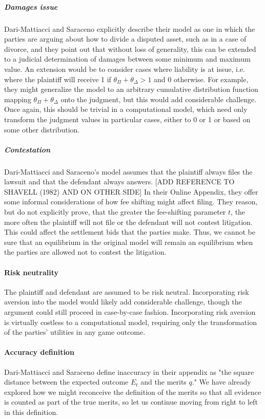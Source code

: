 \documentclass{article}
\begin{document}
\subparagraph{Damages issue}Dari-Mattiacci and Saraceno explicitly describe their model as one in which the parties are arguing about how to divide a disputed asset, such as in a case of divorce, and they point out that without loss of generality, this can be extended to a judicial determination of damages between some minimum and maximum value. An extension would be to consider cases where liability is at issue, i.e. where the plaintiff will receive 1 if $\theta_\Pi + \theta_\Delta > 1$ and 0 otherwise. For example, they might generalize the model to an arbitrary cumulative distribution function mapping $\theta_\Pi + \theta_\Delta$ onto the judgment, but this would add considerable challenge. Once again, this should be trivial in a computational model, which need only transform the judgment values in particular cases, either to 0 or 1 or based on some other distribution.   

\subparagraph{Contestation}Dari-Mattiacci and Saraceno's model assumes that the plaintiff always files the lawsuit and that the defendant always answers. [ADD REFERENCE TO SHAVELL (1982) AND ON OTHER SIDE] In their Online Appendix, they offer some informal considerations of how fee shifting might affect filing. They reason, but do not explicitly prove, that the greater the fee-shifting parameter $t$, the more often the plaintiff will not file or the defendant will not contest litigation. This could affect the settlement bids that the parties make. Thus, we cannot be sure that an equilibrium in the original model will remain an equilibrium when the parties are allowed not to contest the litigation.

\paragraph{Risk neutrality}The plaintiff and defendant are assumed to be risk neutral. Incorporating risk aversion into the model would likely add considerable challenge, though the argument could still proceed in case-by-case fashion. Incorporating risk aversion is virtually costless to a computational model, requiring only the transformation of the parties' utilities in any game outcome. 

\paragraph{Accuracy definition}Dari-Mattiacci and Saraceno define inaccuracy in their appendix as "the square distance between the expected outcome $E_t$ and the merits $q$." We have already explored how we might reconceive the definition of the merits so that all evidence is counted as part of the true merits, so let us continue moving from right to left in this definition.
\end{document}
